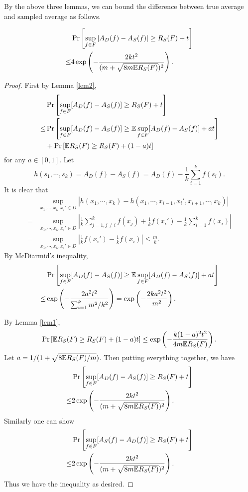 By the above three lemmas, we can bound the difference between true average and sampled average as follows.
\begin{lemma}
$$\begin{aligned}
&\Pr\left[\sup_{f\in F} |A_D(f) - A_S(f)| \geq R_S(F) + t\right] \\
\leq& 4\exp\left(-\frac{2kt^2}{(m+\sqrt{8m\mathbb{E} R_S(F)})^2} \right).\end{aligned}$$
\end{lemma}
\begin{proof}
First by Lemma \ref{lem2},
$$\begin{aligned}
&\Pr\left[\sup_{f\in F} [A_D(f) - A_S(f)] \geq R_S(F) + t\right] \\
\leq& \Pr\left[\sup_{f\in F} [A_D(f) - A_S(f)] \geq \mathbb{E}\sup_{f\in F} [A_D(f) - A_S(f)] + at\right] \\
&+ \Pr\left[\mathbb{E} R_S(F) \geq R_S(F)+(1-a)t\right] \\
\end{aligned}$$
for any $a\in [0,1]$. Let
$$h(s_1,\cdots,s_k) = A_D(f) - A_S(f) = A_D(f) - \frac{1}{k}\sum_{i=1}^k f(s_i).$$
It is clear that 
$$\begin{aligned}
&\sup_{x_1,\cdots,x_k,x_i'\in D} |h(x_1,\cdots,x_k) - h(x_1,\cdots,x_{i-1},x_i',x_{i+1},\cdots,x_k)| \\
=&\sup_{x_1,\cdots,x_k,x_i'\in D} \left|\frac{1}{k}\sum_{j=1, j\not=i}^k f(x_j)+\frac{1}{k}f(x_i') - \frac{1}{k}\sum_{i=1}^k f(x_i)\right| \\
=&\sup_{x_1,\cdots,x_k,x_i'\in D} \left|\frac{1}{k}f(x_i') - \frac{1}{k} f(x_i)\right| \leq \frac{m}{k}.
\end{aligned}$$
By McDiarmid's inequality,
$$\begin{aligned}
&\Pr\left[\sup_{f\in F} [A_D(f) - A_S(f)] \geq \mathbb{E}\sup_{f\in F} [A_D(f) - A_S(f)] + at\right] \\
\leq& \exp\left(-\frac{2a^2t^2}{\sum_{i=1}^k m^2/k^2}\right)
=\exp\left(-\frac{2ka^2t^2}{m^2}\right).
\end{aligned}$$

By Lemma \ref{lem1},
$$\Pr\left[\mathbb{E} R_S(F) \geq R_S(F)+(1-a)t\right] \leq \exp\left(-\frac{k(1-a)^2t^2}{4m\mathbb{E} R_S(F)}\right).$$
Let $a = 1/(1+\sqrt{8\mathbb{E} R_S(F) / m})$. Then putting everything together, we have 
$$\begin{aligned}
&\Pr\left[\sup_{f\in F} [A_D(f) - A_S(f)] \geq R_S(F) + t\right] \\
\leq& 2\exp\left(-\frac{2kt^2}{(m+\sqrt{8m\mathbb{E} R_S(F)})^2} \right).\end{aligned}$$
Similarly one can show 
$$\begin{aligned}
&\Pr\left[\sup_{f\in F} [A_S(f) - A_D(f)] \geq R_S(F) + t\right] \\
\leq& 2\exp\left(-\frac{2kt^2}{(m+\sqrt{8m\mathbb{E} R_S(F)})^2} \right).\end{aligned}$$
Thus we have the inequality as desired.
\end{proof}
